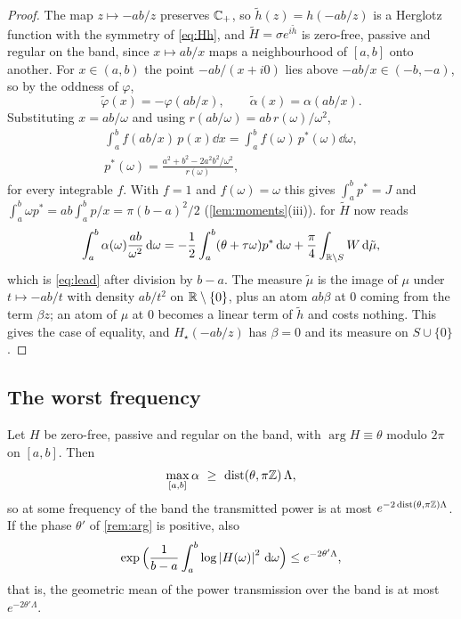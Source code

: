 \begin{proof}
The map $z\mapsto-ab/z$ preserves $\mathbb C_{+}$, so $\tilde h(z)=h(-ab/z)$ is a
Herglotz function with the symmetry of \eqref{eq:Hh}, and $\tilde H=\sigma
e^{i\tilde h}$ is zero-free, passive and regular on the band, since
$x\mapsto ab/x$ maps a neighbourhood of $[a,b]$ onto another. For $x\in(a,b)$
the point $-ab/(x+i0)$ lies above $-ab/x\in(-b,-a)$, so by the oddness of
$\varphi$,
\[
\tilde\varphi(x)=-\varphi(ab/x),\qquad\tilde\alpha(x)=\alpha(ab/x).
\]
Substituting $x=ab/\omega$ and using $r(ab/\omega)=ab\,r(\omega)/\omega^2$,
\begin{gather*}
\int_a^bf(ab/x)\,p(x)\dd x=\int_a^bf(\omega)\,p^*(\omega)\dd\omega,\\
p^*(\omega)=\frac{a^2+b^2-2a^2b^2/\omega^2}{r(\omega)},
\end{gather*}
for every integrable $f$. With $f=1$ and $f(\omega)=\omega$ this gives
$\int_a^bp^*=J$ and $\int_a^b\omega p^*=ab\int_a^bp/x=\pi(b-a)^2/2$
(\cref{lem:moments}(iii)).  for $\tilde H$ now reads
\[
\int_a^b\alpha(\omega)\frac{ab}{\omega^2}\,\mathrm d\omega
=-\frac12\int_a^b(\theta+\tau\omega)p^*\,\mathrm d\omega+\frac\pi4\int_{\mathbb R\setminus S}W\,\mathrm d\tilde\mu ,
\]
which is \eqref{eq:lead} after division by $b-a$. The measure $\tilde\mu$
is the image of $\mu$ under $t\mapsto-ab/t$ with density $ab/t^2$ on
$\mathbb R\setminus\{0\}$, plus an atom $ab\beta$ at $0$ coming from the term
$\beta z$; an atom of $\mu$ at $0$ becomes a linear term of $\tilde h$ and
costs nothing. This gives the case of equality, and $H_\star(-ab/z)$ has
$\beta=0$ and its measure on $S\cup\{0\}$.
\end{proof}

\subsection{The worst frequency}

\begin{corollary}\label{cor:worst}
Let $H$ be zero-free, passive and regular on the band, with $\arg
H\equiv\theta$ modulo $2\pi$ on $[a,b]$. Then
\[
\max_{[a,b]}\alpha\ \ge\ \dist(\theta,\pi\Z)\,\Lambda ,
\]
so at some frequency of the band the transmitted power is at most
$e^{-2\operatorname{dist}(\theta,\pi\mathbb Z)\Lambda}$. If the phase $\theta'$ of
\cref{rem:arg} is positive, also
\[
\exp\Big(\frac1{b-a}\int_a^b\log\left|H(\omega)\right|^2\,\mathrm d\omega\Big)\le e^{-2\theta'\Lambda},
\]
that is, the geometric mean of the power transmission over the band is at
most $e^{-2\theta'\Lambda}$.
\end{corollary}

